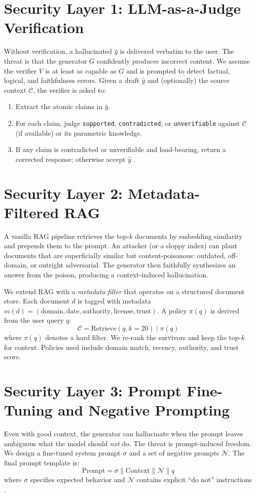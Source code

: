 \documentclass[11pt,a4paper]{article}
\begin{document}
\section{Security Layer 1: LLM-as-a-Judge Verification}
Without verification, a hallucinated $\hat{y}$ is delivered verbatim to the user. The threat is that the generator $G$ confidently produces incorrect content. We assume the verifier $V$ is at least as capable as $G$ and is prompted to detect factual, logical, and faithfulness errors. Given a draft $\hat{y}$ and (optionally) the source context $\mathcal{C}$, the verifier is asked to:
\begin{enumerate}
    \item Extract the atomic claims in $\hat{y}$.
    \item For each claim, judge \texttt{supported}, \texttt{contradicted}, or \texttt{unverifiable} against $\mathcal{C}$ (if available) or its parametric knowledge.
    \item If any claim is contradicted or unverifiable and load-bearing, return a corrected response; otherwise accept $\hat{y}$ \cite{8,11}.
\end{enumerate}

\section{Security Layer 2: Metadata-Filtered RAG}
A vanilla RAG pipeline retrieves the top-$k$ documents by embedding similarity and prepends them to the prompt. An attacker (or a sloppy index) can plant documents that are superficially similar but content-poisonous: outdated, off-domain, or outright adversarial. The generator then faithfully synthesizes an answer from the poison, producing a context-induced hallucination.

We extend RAG with a \textit{metadata filter} that operates on a structured document store. Each document $d$ is tagged with metadata $m(d) = (\text{domain}, \text{date}, \text{authority}, \text{license}, \text{trust})$. A policy $\pi(q)$ is derived from the user query $q$:
\begin{equation}
\mathcal{C} = \text{Retrieve}(q, k=20) \mid \pi(q)
\end{equation}
where $\pi(q)$ denotes a hard filter. We re-rank the survivors and keep the top-$k$ for context. Policies used include domain match, recency, authority, and trust score.

\section{Security Layer 3: Prompt Fine-Tuning and Negative Prompting}
Even with good context, the generator can hallucinate when the prompt leaves ambiguous what the model should \textit{not} do. The threat is prompt-induced freedom. We design a fine-tuned system prompt $\sigma$ and a set of negative prompts $\mathcal{N}$. The final prompt template is:
\begin{equation}
\text{Prompt} = \sigma \parallel \text{Context} \parallel \mathcal{N} \parallel q
\end{equation}
where $\sigma$ specifies expected behavior and $\mathcal{N}$ contains explicit ``do not'' instructions \cite{14}.
\end{document}
